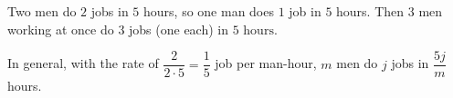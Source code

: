 Two men do $2$ jobs in $5$ hours, so one man does $1$ job in $5$ hours. Then $3$ men working at once do $3$ jobs (one each) in $\boxed{5\text{ hours}}$.

In general, with the rate of $\dfrac{2}{2\cdot5}=\dfrac{1}{5}$ job per man-hour, $m$ men do $j$ jobs in $\dfrac{5j}{m}$ hours.
